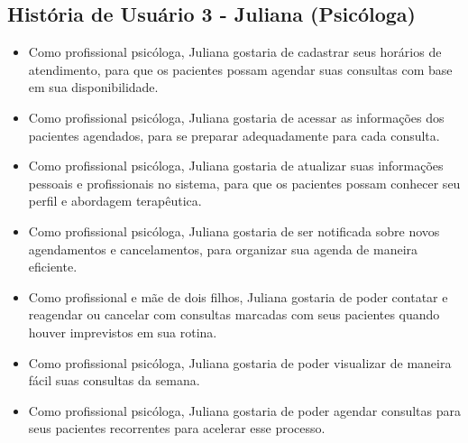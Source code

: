 \documentclass[a4paper,12pt]{report}
\begin{document}
\subsection{História de Usuário 3 - Juliana (Psicóloga)}
\begin{itemize}
    \item Como profissional psicóloga, Juliana gostaria de cadastrar seus horários de atendimento, para que os pacientes possam agendar suas consultas com base em sua disponibilidade.
    \item Como profissional psicóloga, Juliana gostaria de acessar as informações dos pacientes agendados, para se preparar adequadamente para cada consulta.
    \item Como profissional psicóloga, Juliana gostaria de atualizar suas informações pessoais e profissionais no sistema, para que os pacientes possam conhecer seu perfil e abordagem terapêutica.
    \item Como profissional psicóloga, Juliana gostaria de ser notificada sobre novos agendamentos e cancelamentos, para organizar sua agenda de maneira eficiente.
    \item Como profissional e mãe de dois filhos, Juliana gostaria de poder contatar e reagendar ou cancelar com consultas marcadas com seus pacientes quando houver imprevistos em sua rotina.
    \item Como profissional psicóloga, Juliana gostaria de poder visualizar de maneira fácil suas consultas da semana.
    \item Como profissional psicóloga, Juliana gostaria de poder agendar consultas para seus pacientes recorrentes para acelerar esse processo.
\end{itemize}
\end{document}
